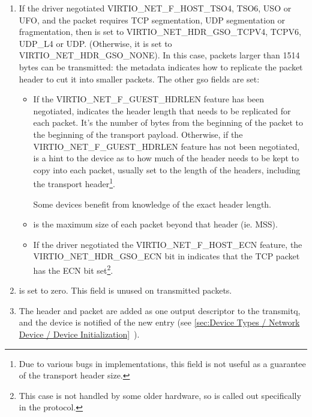 \begin{enumerate}
\item If the driver negotiated
  VIRTIO_NET_F_HOST_TSO4, TSO6, USO or UFO, and the packet requires
  TCP segmentation, UDP segmentation or fragmentation, then 
  is set to VIRTIO_NET_HDR_GSO_TCPV4, TCPV6, UDP_L4 or UDP.
  (Otherwise, it is set to VIRTIO_NET_HDR_GSO_NONE). In this
  case, packets larger than 1514 bytes can be transmitted: the
  metadata indicates how to replicate the packet header to cut it
  into smaller packets. The other gso fields are set:

  \begin{itemize}
  \item If the VIRTIO_NET_F_GUEST_HDRLEN feature has been negotiated,
     indicates the header length that needs to be replicated
    for each packet. It's the number of bytes from the beginning of the packet
    to the beginning of the transport payload.
    Otherwise, if the VIRTIO_NET_F_GUEST_HDRLEN feature has not been negotiated,
     is a hint to the device as to how much of the header
    needs to be kept to copy into each packet, usually set to the
    length of the headers, including the transport header\footnote{Due to various bugs in implementations, this field is not useful
as a guarantee of the transport header size.
}.

  \begin{note}
  Some devices benefit from knowledge of the exact header length.
  \end{note}

  \item {} is the maximum size of each packet beyond that
    header (ie. MSS).

  \item If the driver negotiated the VIRTIO_NET_F_HOST_ECN feature,
    the VIRTIO_NET_HDR_GSO_ECN bit in 
    indicates that the TCP packet has the ECN bit set\footnote{This case is not handled by some older hardware, so is called out
specifically in the protocol.}.
   \end{itemize}

\item {} is set to zero.  This field is unused on transmitted packets.

\item The header and packet are added as one output descriptor to the
  transmitq, and the device is notified of the new entry
  (see \ref{sec:Device Types / Network Device / Device Initialization}~).
\end{enumerate}

